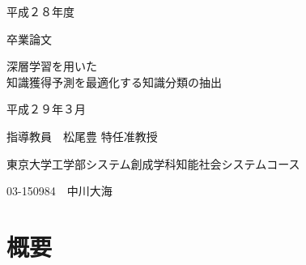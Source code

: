 \documentclass[a4j,11pt]{jreport}
\begin{document}
\begin{center}
\vspace*{1.6cm}
\Large 平成２８年度

\vspace*{0.4cm}
\Large 卒業論文

\vspace*{1.6cm}

\LARGE 深層学習を用いた\\知識獲得予測を最適化する知識分類の抽出
\vspace{6.4cm}

\Large 平成２９年３月

\vspace{0.2cm}
\Large 指導教員　松尾豊 特任准教授

\vspace{0.6cm}
\Large 東京大学工学部システム創成学科知能社会システムコース

\vspace{0.2cm}
\Large 03-150984　中川大海


\end{center}
\normalsize
\thispagestyle{empty}
\clearpage

\chapter*{概要}

\renewcommand{\baselinestretch}{1.3} 




\newpage
{}
\tableofcontents
\newpage
\listoffigures
\newpage
\listoftables
\newpage


\pagestyle{fancy}










\newpage
{}
\label{chap:reference}
\fancyhf{}
\rhead{\thepage}
\cfoot{\thepage}

%





%

\end{document}
